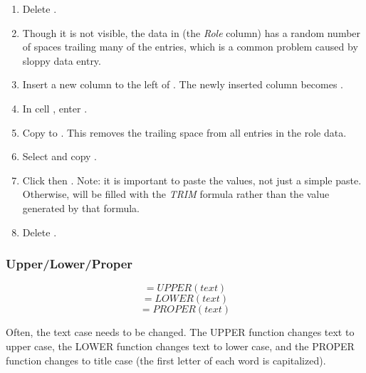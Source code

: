 \begin{enumbox}
\begin{enumerate}
		\item Delete .
		\item Though it is not visible, the data in  (the \textit{Role} column) has a random number of spaces trailing many of the entries, which is a common problem caused by sloppy data entry.
		\item Insert a new column to the left of . The newly inserted column becomes .
		\item In cell , enter .
		\item Copy  to . This removes the trailing space from all entries in the role data.
		\item Select and copy .
		\item Click  then . Note: it is important to paste the values, not just a simple paste. Otherwise,  will be filled with the \textit{TRIM} formula rather than the value generated by that formula.
		\item Delete .
	\end{enumerate}
\end{enumbox}

\subsubsection{Upper/Lower/Proper}

\[ =UPPER(text) \]
\[ =LOWER(text) \]
\[ =PROPER(text) \]

Often, the text case needs to be changed. The UPPER function changes text to upper case, the LOWER function changes text to lower case, and the PROPER function changes to title case (the first letter of each word is capitalized). 

